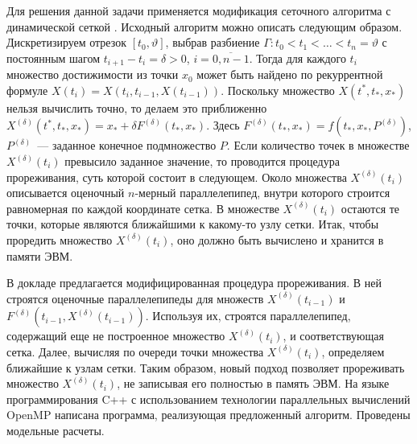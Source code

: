 Для решения данной задачи применяется модификация сеточного алгоритма с динамической сеткой \cite{Ushak,Izm1,Izm2}. Исходный алгоритм можно описать следующим образом. Дискретизируем отрезок $[t_0,\vartheta]$, выбрав разбиение $\Gamma: t_0<t_1<\ldots<t_n=\vartheta$
с постоянным шагом $t_{i+1}-t_i=\delta>0$, $i=\overline{0,n-1}$.  Тогда для каждого $t_i$ множество достижимости из точки $x_0$ может быть найдено по рекуррентной формуле $X(t_i)=X(t_i,t_{i-1},X(t_{i-1}))$. Поскольку множество $X(t^*,t_*, x_*)$ нельзя вычислить точно, то делаем это приближенно $X^{(\delta)}(t^*,t_*, x_*)=x_*+\delta F^{(\delta)}(t_*,x_*)$.
Здесь $F^{(\delta)}(t_*,x_*)=f(t_*,x_*, P^{(\delta)})$, $P^{(\delta)}$~--- заданное конечное подмножество $P$. 
Если количество точек в множестве $X^{(\delta)}(t_i)$ превысило заданное значение, то проводится процедура прореживания, суть которой состоит в следующем. Около множества $X^{(\delta)}(t_i)$ описывается оценочный $n$-мерный параллелепипед, внутри которого строится равномерная по каждой координате сетка. В множестве $X^{(\delta)}(t_i)$ остаются те точки, которые являются ближайшими к какому-то узлу сетки.  Итак, чтобы проредить множество $X^{(\delta)}(t_i)$, оно должно быть вычислено и хранится в памяти ЭВМ.

В докладе предлагается модифицированная процедура прореживания. В ней строятся оценочные параллелепипеды для множеств $X^{(\delta)}(t_{i-1})$ и $F^{(\delta)}(t_{i-1},X^{(\delta)}(t_{i-1}))$. Используя их, строятся параллелепипед, содержащий еще не построенное множество $X^{(\delta)}(t_{i})$, и соответствующая сетка. Далее,  вычисляя по очереди точки множества $X^{(\delta)}(t_{i})$, определяем ближайшие к узлам сетки.
 Таким образом, новый подход позволяет прореживать множество $X^{(\delta)}(t_i)$, не записывая его полностью в память ЭВМ. На языке программирования C++ с использованием технологии параллельных вычислений OpenMP написана программа, реализующая предложенный алгоритм. Проведены модельные расчеты.





%

